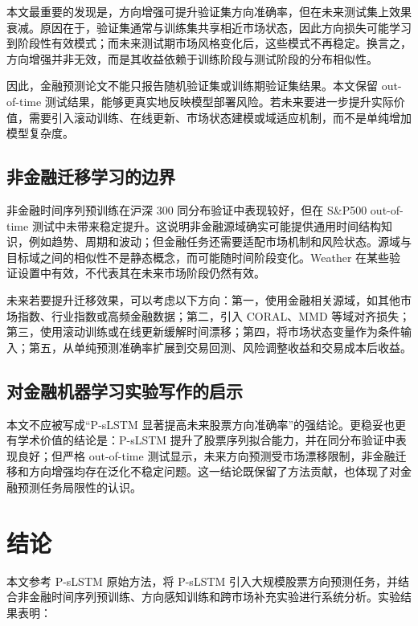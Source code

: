 \documentclass[UTF8,zihao=-4,twocolumn,fontset=fandol]{ctexart}
\begin{document}
本文最重要的发现是，方向增强可提升验证集方向准确率，但在未来测试集上效果衰减。原因在于，验证集通常与训练集共享相近市场状态，因此方向损失可能学习到阶段性有效模式；而未来测试期市场风格变化后，这些模式不再稳定。换言之，方向增强并非无效，而是其收益依赖于训练阶段与测试阶段的分布相似性。

因此，金融预测论文不能只报告随机验证集或训练期验证集结果。本文保留 out-of-time 测试结果，能够更真实地反映模型部署风险。若未来要进一步提升实际价值，需要引入滚动训练、在线更新、市场状态建模或域适应机制，而不是单纯增加模型复杂度。

\subsection{非金融迁移学习的边界}

非金融时间序列预训练在沪深 300 同分布验证中表现较好，但在 S\&P500 out-of-time 测试中未带来稳定提升。这说明非金融源域确实可能提供通用时间结构知识，例如趋势、周期和波动；但金融任务还需要适配市场机制和风险状态。源域与目标域之间的相似性不是静态概念，而可能随时间阶段变化。Weather 在某些验证设置中有效，不代表其在未来市场阶段仍然有效。

未来若要提升迁移效果，可以考虑以下方向：第一，使用金融相关源域，如其他市场指数、行业指数或高频金融数据；第二，引入 CORAL、MMD 等域对齐损失；第三，使用滚动训练或在线更新缓解时间漂移；第四，将市场状态变量作为条件输入；第五，从单纯预测准确率扩展到交易回测、风险调整收益和交易成本后收益。

\subsection{对金融机器学习实验写作的启示}

本文不应被写成“P-sLSTM 显著提高未来股票方向准确率”的强结论。更稳妥也更有学术价值的结论是：P-sLSTM 提升了股票序列拟合能力，并在同分布验证中表现良好；但严格 out-of-time 测试显示，未来方向预测受市场漂移限制，非金融迁移和方向增强均存在泛化不稳定问题。这一结论既保留了方法贡献，也体现了对金融预测任务局限性的认识。

\section{结论}

本文参考 P-sLSTM 原始方法，将 P-sLSTM 引入大规模股票方向预测任务，并结合非金融时间序列预训练、方向感知训练和跨市场补充实验进行系统分析。实验结果表明：
\end{document}
